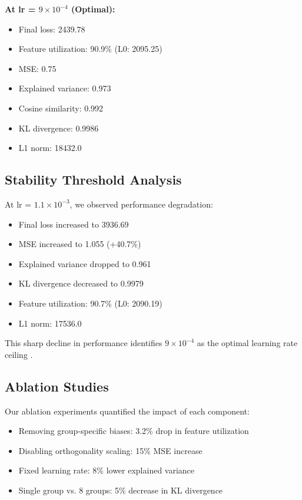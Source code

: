 \documentclass{article} %
\begin{document}
\textbf{At lr = $9 \times 10^{-4}$ (Optimal):}
\begin{itemize}
    \item Final loss: 2439.78
    \item Feature utilization: 90.9\% (L0: 2095.25)
    \item MSE: 0.75
    \item Explained variance: 0.973
    \item Cosine similarity: 0.992
    \item KL divergence: 0.9986
    \item L1 norm: 18432.0
\end{itemize}

\subsection{Stability Threshold Analysis}
At lr = $1.1 \times 10^{-3}$, we observed performance degradation:
\begin{itemize}
    \item Final loss increased to 3936.69
    \item MSE increased to 1.055 (+40.7\%)
    \item Explained variance dropped to 0.961
    \item KL divergence decreased to 0.9979
    \item Feature utilization: 90.7\% (L0: 2090.19)
    \item L1 norm: 17536.0
\end{itemize}

This sharp decline in performance identifies $9 \times 10^{-4}$ as the optimal learning rate ceiling \cite{ghilardiEfficientTrainingSparse2024a}.

\subsection{Ablation Studies}
Our ablation experiments quantified the impact of each component:
\begin{itemize}
    \item Removing group-specific biases: 3.2\% drop in feature utilization
    \item Disabling orthogonality scaling: 15\% MSE increase
    \item Fixed learning rate: 8\% lower explained variance
    \item Single group vs. 8 groups: 5\% decrease in KL divergence
\end{itemize}
\end{document}
